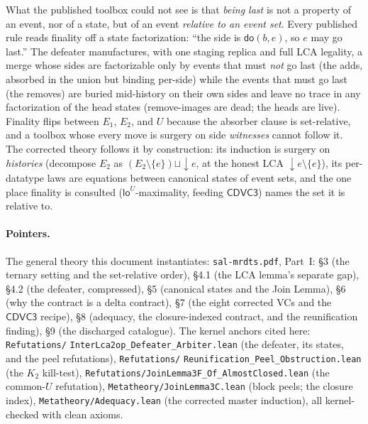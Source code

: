 \documentclass[11pt]{article}
\newcommand{\loE}[1]{\mathsf{lo}^{#1}}
\newcommand{\dow}[1]{{\downarrow}#1}
\newcommand{\cd}{\mathsf{CDVC3}}
\newcommand{\lean}[1]{\texttt{#1}}
\begin{document}
What the published toolbox could not see is that \emph{being last} is
not a property of an event, nor of a state, but of an event
\emph{relative to an event set}. Every published rule reads finality
off a state factorization: ``the side is
$\mathsf{do}(b, e)$, so $e$ may go last.'' The defeater manufactures,
with one staging replica and full LCA legality, a merge whose sides
are factorizable only by events that must \emph{not} go last (the
adds, absorbed in the union but binding per-side) while the events
that must go last (the removes) are buried mid-history on their own
sides and leave no trace in any factorization of the head states
(remove-images are dead; the heads are live). Finality flips between
$E_1$, $E_2$, and $U$ because the absorber clause is set-relative,
and a toolbox whose every move is surgery on side \emph{witnesses}
cannot follow it. The corrected theory follows it by construction: its
induction is surgery on \emph{histories} (decompose $E_2$ as
$(E_2 \setminus \{e\}) \sqcup \dow{e}$, at the honest LCA
$\dow{e} \setminus \{e\}$), its per-datatype laws are equations
between canonical states of event sets, and the one place finality is
consulted ($\loE{U}$-maximality, feeding $\cd$) names the set it is
relative to.

\paragraph{Pointers.} The general theory this document instantiates:
\texttt{sal-mrdts.pdf}, Part~I: \S3 (the ternary setting and the
set-relative order), \S4.1 (the LCA lemma's separate gap), \S4.2 (the
defeater, compressed), \S5 (canonical states and the Join Lemma), \S6
(why the contract is a delta contract), \S7 (the eight corrected VCs
and the $\cd$ recipe), \S8 (adequacy, the closure-indexed contract,
and the reunification finding), \S9 (the discharged catalogue). The
kernel anchors cited here: \lean{Refutations/}%
\lean{InterLca2op\_Defeater\_Arbiter.lean} (the defeater, its states,
and the peel refutations), \lean{Refutations/}%
\lean{Reunification\_Peel\_Obstruction.lean} (the $K_2$ kill-test),
\lean{Refutations/JoinLemma3F\_Of\_AlmostClosed.lean} (the common-$U$
refutation), \lean{Metatheory/JoinLemma3C.lean} (block peels; the
closure index), \lean{Metatheory/Adequacy.lean} (the corrected master
induction), all kernel-checked with clean axioms.
\end{document}
